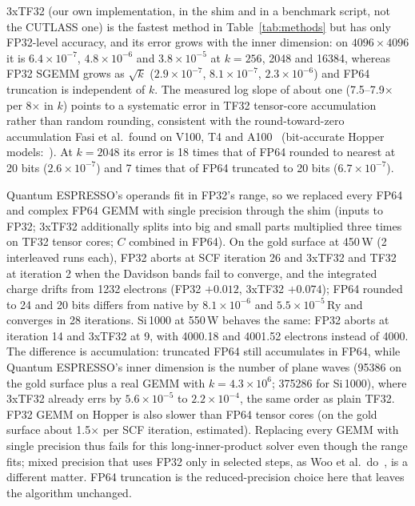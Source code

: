 \documentclass[conference]{IEEEtran}
\newcommand{\W}{\,W}
\newcommand{\Ry}{\,Ry}
\newcommand{\ee}[2]{#1{\times}10^{#2}}  %
\begin{document}
3xTF32 (our own implementation, in the shim and in a benchmark script, not the CUTLASS one) is the fastest method in
Table~\ref{tab:methods} but has only FP32-level accuracy, and its error grows with the inner dimension: on $4096{\times}4096$ it is $\ee{6.4}{-7}$, $\ee{4.8}{-6}$ and $\ee{3.8}{-5}$ at $k=256$, 2048 and
16384, whereas FP32 SGEMM grows as $\sqrt{k}$ ($\ee{2.9}{-7}$, $\ee{8.1}{-7}$, $\ee{2.3}{-6}$) and FP64 truncation
is independent of $k$. The measured log slope of about one (7.5--7.9$\times$ per 8$\times$ in $k$) points to a
systematic error in TF32 tensor-core accumulation rather than random rounding, consistent with the round-toward-zero
accumulation Fasi et al.\ found on V100, T4 and A100~\cite{Fasi2021} (bit-accurate Hopper models:~\cite{Khattak2025}).
At $k=2048$ its error is 18 times that of FP64 rounded to nearest at 20 bits ($\ee{2.6}{-7}$) and 7 times that of
FP64 truncated to 20 bits ($\ee{6.7}{-7}$).

Quantum ESPRESSO's operands fit in FP32's range, so we replaced every FP64 and complex FP64 GEMM with single
precision through the shim (inputs to FP32; 3xTF32 additionally splits into big and small parts multiplied three
times on TF32 tensor cores; $C$ combined in FP64). On the gold surface at 450\W{} (2 interleaved runs each), FP32
aborts at SCF iteration 26 and 3xTF32 and TF32 at iteration 2 when the Davidson bands fail to converge, and the
integrated charge drifts from 1232 electrons (FP32 $+0.012$, 3xTF32 $+0.074$); FP64 rounded to 24 and 20 bits
differs from native by $\ee{8.1}{-6}$ and $\ee{5.5}{-5}$\Ry{} and converges in 28 iterations. Si\,1000 at 550\W{}
behaves the same: FP32 aborts at iteration 14 and 3xTF32 at 9, with 4000.18 and 4001.52 electrons instead of 4000.
The difference is accumulation: truncated FP64 still accumulates in FP64, while Quantum ESPRESSO's inner dimension
is the number of plane waves (95386 on the gold surface plus a real GEMM with $k=4.3{\times}10^{6}$; 375286 for
Si\,1000), where 3xTF32 already errs by $\ee{5.6}{-5}$ to $\ee{2.2}{-4}$, the same order as plain TF32. FP32 GEMM on
Hopper is also slower than FP64 tensor cores (on the gold surface about 1.5$\times$ per SCF iteration, estimated).
Replacing every GEMM with single precision thus fails for this long-inner-product solver even though the range fits;
mixed precision that uses FP32 only in selected steps, as Woo et al.\ do~\cite{Woo2023}, is a different matter. FP64
truncation is the reduced-precision choice here that leaves the algorithm unchanged.
\end{document}
